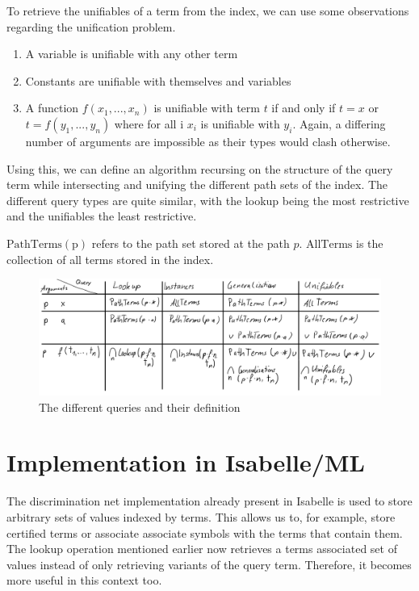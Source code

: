 To retrieve the unifiables of a term from the index, we can use some observations regarding the unification problem.
\begin{enumerate}
  \item A variable is unifiable with any other term
  \item Constants are unifiable with themselves and variables
  \item A function $f(x_{1},...,x_{n})$ is unifiable with term $t$ if and only if $t = x$ or $t = f(y_{1},...,y_{n})$ where for all i $x_{i}$ is unifiable with $y_{i}$. Again, a differing number of arguments are impossible as their types would clash otherwise.
\end{enumerate}
Using this, we can define an algorithm recursing on the structure of the query term while intersecting and unifying the different path sets of the index. The different query types are quite similar, with the lookup being the most restrictive and the unifiables the least restrictive.

$\mathrm{PathTerms(p)}$ refers to the path set stored at the path $p$. $\mathrm{AllTerms}$ is the collection of all terms stored in the index.
\begin{figure}[h]
\centering
\includegraphics[scale=0.25]{figures/queries.png}
\caption{The different queries and their definition}
\end{figure}

\section{Implementation in Isabelle/ML}
The discrimination net implementation already present in Isabelle is used to store arbitrary sets of values indexed by terms. This allows us to, for example, store certified terms or associate associate symbols with the terms that contain them. The lookup operation mentioned earlier now retrieves a terms associated set of values instead of only retrieving variants of the query term. Therefore, it becomes more useful in this context too.

